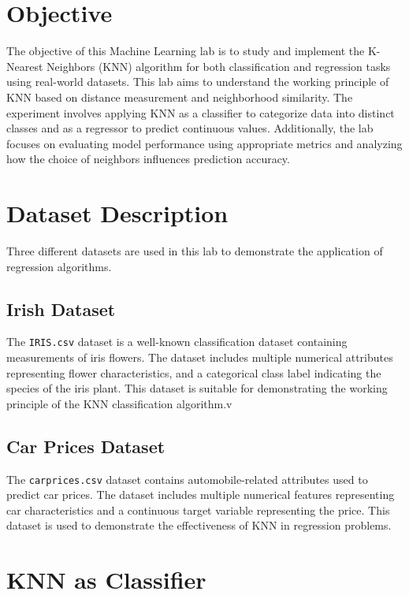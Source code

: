 \documentclass[11pt]{article}
\begin{document}
    
\tableofcontents
\thispagestyle{empty}
\clearpage
{}
    
	
\section{Objective}

The objective of this Machine Learning lab is to study and implement the K-Nearest Neighbors (KNN) algorithm for both classification and regression tasks using real-world datasets. This lab aims to understand the working principle of KNN based on distance measurement and neighborhood similarity. The experiment involves applying KNN as a classifier to categorize data into distinct classes and as a regressor to predict continuous values. Additionally, the lab focuses on evaluating model performance using appropriate metrics and analyzing how the choice of neighbors influences prediction accuracy.


\section{Dataset Description}

Three different datasets are used in this lab to demonstrate the application of regression algorithms.

\subsection*{Irish Dataset}
The \texttt{IRIS.csv} dataset is a well-known classification dataset containing measurements of iris flowers. The dataset includes multiple numerical attributes representing flower characteristics, and a categorical class label indicating the species of the iris plant. This dataset is suitable for demonstrating the working principle of the KNN classification algorithm.v

\subsection*{Car Prices Dataset}
The \texttt{carprices.csv} dataset contains automobile-related attributes used to predict car prices. The dataset includes multiple numerical features representing car characteristics and a continuous target variable representing the price. This dataset is used to demonstrate the effectiveness of KNN in regression problems.
   

\section{KNN as Classifier}\label{knn-as-classifier-as-regressor-in-another-program}
\end{document}
